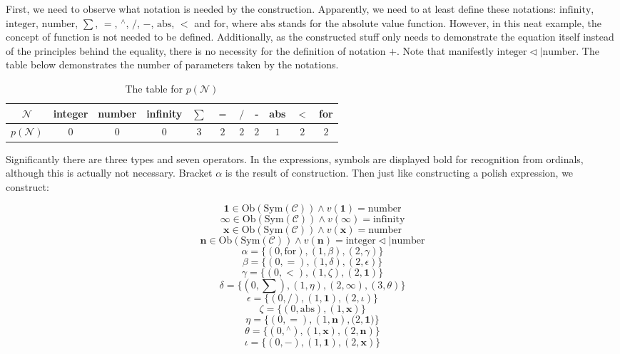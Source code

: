 \documentclass{article}
\numberwithin{theorem}{section}	%
\numberwithin{axiom}{section}	%
\numberwithin{definition}{section}	%
\begin{document}
First, we need to observe what notation is needed by the construction. Apparently, we need to at least define these notations: \(\text{infinity}\), \(\text{integer}\), \(\text{number}\),\textit{  }\textit{ \(\sum\)}, \(=\), \({}^{\wedge}\), \(/\), \(-\), \(\text{abs}\), \(<\) and \(\text{for}\), where \(\text{abs}\) stands for the absolute value function. However, in this neat example, the concept of function is not needed to be defined. Additionally, as the constructed stuff only needs to demonstrate the equation itself instead of the principles behind the equality, there is no necessity for the definition of notation \(+\). Note that manifestly \(\text{integer} \triangleleft | \text{number}\). The table below demonstrates the number of parameters taken by the notations.

\begin{table}
	\centering
	\begin{tabular}{ccccccccccc}
		\toprule
		$\mathcal{N}$ & integer & number & infinity & $\sum$ & $=$ & $/$ & - & abs & $<$ & for \\
		\midrule
		$\mathit{p} (\mathcal{N})$ & $0$ & $0$ & $0$ & $3$ & $2$ & $2$ & $2$ & $1$ & $2$ & $2$ \\
		\bottomrule
	\end{tabular}
	\caption{The table for $\mathit{p}(\mathcal{N})$}
\end{table}

Significantly there are three types and seven operators. In the expressions, symbols are displayed bold for recognition from ordinals, although this
is actually not necessary. Bracket \(\alpha\) is the result of construction. Then just like constructing a polish expression, we construct:

\[\pmb{1}\in \text{Ob}(\text{Sym}(\mathcal{C}))\land \mathit{v}(\pmb{1})=\text{number}\]
\[\pmb{\infty }\in \text{Ob}(\text{Sym}(\mathcal{C}))\land \mathit{v}(\pmb{\infty })=\text{infinity}\]
\[\pmb{x}\in \text{Ob}(\text{Sym}(\mathcal{C}))\land \mathit{v}(\pmb{x})=\text{number}\]
\[\pmb{n}\in \text{Ob}(\text{Sym}(\mathcal{C}))\land \mathit{v}(\pmb{n})=\text{integer}\triangleleft |\text{number}\]
\[\alpha =\{(0,\text{for}),(1,\beta ),(2,\gamma )\}\]
\[\beta =\{(0,=),(1,\delta ),(2,\epsilon )\}\]
\[\gamma =\{(0,<),(1,\zeta ),(2,\pmb{1})\}\]
\[\delta =\{(0,\sum ),(1,\eta ),(2,\pmb{\infty }), (3,\theta )\}\]
\[\epsilon =\{(0,/),(1,\pmb{1}),(2,\iota )\}\]
\[\zeta =\{(0,\text{abs}),(1,\pmb{x})\}\]
\[\eta =\{(0,=),(1,\pmb{n}),(2,\pmb{1}\pmb{)}\pmb{\}}\]
\[\theta =\{(0,{}^{\wedge}),(1,\pmb{x}),(2,\pmb{n})\}\]
\[\iota =\{(0,-),(1,\pmb{1}),(2,\pmb{x})\}\]
\end{document}
